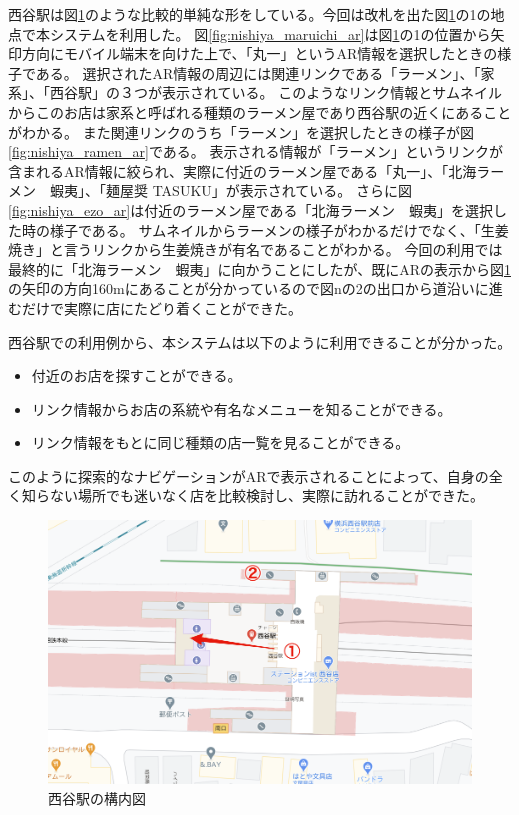 西谷駅は図\ref{fig:nishiya_2d}のような比較的単純な形をしている。今回は改札を出た図\ref{fig:nishiya_2d}の\textcircled{\scriptsize{1}}の地点で本システムを利用した。
図\ref{fig:nishiya_maruichi_ar}は図\ref{fig:nishiya_2d}の\textcircled{\scriptsize{1}}の位置から矢印方向にモバイル端末を向けた上で、「丸一」というAR情報を選択したときの様子である。
選択されたAR情報の周辺には関連リンクである「ラーメン」、「家系」、「西谷駅」の３つが表示されている。
このようなリンク情報とサムネイルからこのお店は家系と呼ばれる種類のラーメン屋であり西谷駅の近くにあることがわかる。
また関連リンクのうち「ラーメン」を選択したときの様子が図\ref{fig:nishiya_ramen_ar}である。
表示される情報が「ラーメン」というリンクが含まれるAR情報に絞られ、実際に付近のラーメン屋である「丸一」、「北海ラーメン　蝦夷」、「麺屋奨 TASUKU」が表示されている。
さらに図\ref{fig:nishiya_ezo_ar}は付近のラーメン屋である「北海ラーメン　蝦夷」を選択した時の様子である。
サムネイルからラーメンの様子がわかるだけでなく、「生姜焼き」と言うリンクから生姜焼きが有名であることがわかる。
今回の利用では最終的に「北海ラーメン　蝦夷」に向かうことにしたが、既にARの表示から図\ref{fig:nishiya_2d}の矢印の方向160mにあることが分かっているので図nの\textcircled{\scriptsize{2}}の出口から道沿いに進むだけで実際に店にたどり着くことができた。

西谷駅での利用例から、本システムは以下のように利用できることが分かった。
\begin{itemize}
  \item 付近のお店を探すことができる。
  \item リンク情報からお店の系統や有名なメニューを知ることができる。
  \item リンク情報をもとに同じ種類の店一覧を見ることができる。
\end{itemize}
このように探索的なナビゲーションがARで表示されることによって、自身の全く知らない場所でも迷いなく店を比較検討し、実際に訪れることができた。

\begin{figure}[H]
  \centering
  \includegraphics[width=120mm]{images/nishiya_2d.png}
  \caption{西谷駅の構内図} \label{fig:nishiya_2d}
\end{figure}

